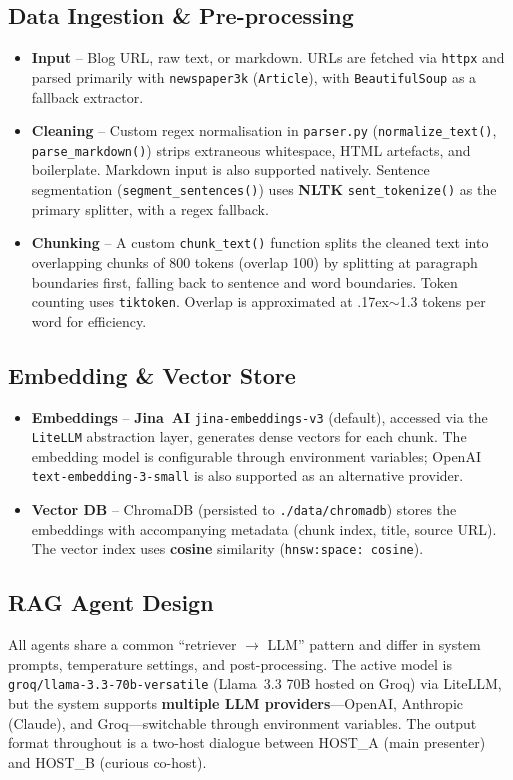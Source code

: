 \documentclass[sigconf,natbib=false]{acmart}   %
\begin{document}
\subsection{Data Ingestion \& Pre-processing}
\begin{itemize}
  \item \textbf{Input} -- Blog URL, raw text, or markdown.  URLs are fetched via \texttt{httpx} and parsed primarily with \texttt{newspaper3k} (\texttt{Article}), with \texttt{BeautifulSoup} as a fallback extractor.
  \item \textbf{Cleaning} -- Custom regex normalisation in 
  \texttt{parser.py} (\texttt{normalize\_text()}, \texttt{parse\_markdown()}) strips extraneous whitespace, HTML artefacts, and boilerplate.  Markdown input is also supported natively.  Sentence segmentation (\texttt{segment\_sentences()}) uses \textbf{NLTK} \texttt{sent\_tokenize()} as the primary splitter, with a regex fallback.
  \item \textbf{Chunking} -- A custom \texttt{chunk\_text()} function splits the cleaned text into overlapping chunks of 800 tokens (overlap 100) by splitting at paragraph boundaries first, falling back to sentence and word boundaries.  Token counting uses \texttt{tiktoken}.  Overlap is approximated at {\raise.17ex\hbox{$\scriptstyle\sim$}}1.3 tokens per word for efficiency.
\end{itemize}

\subsection{Embedding \& Vector Store}
\begin{itemize}
  \item \textbf{Embeddings} -- \textbf{Jina~AI} \texttt{jina-embeddings-v3} (default), accessed via the \texttt{LiteLLM} abstraction layer, generates dense vectors for each chunk.  The embedding model is configurable through environment variables; OpenAI \texttt{text-embedding-3-small} is also supported as an alternative provider.
  \item \textbf{Vector DB} -- ChromaDB (persisted to \texttt{./data/chromadb}) stores the embeddings with accompanying metadata (chunk index, title, source URL).  The vector index uses \textbf{cosine} similarity (\texttt{hnsw:space: cosine}).
\end{itemize}

\subsection{RAG Agent Design}
All agents share a common ``retriever $\to$ LLM'' pattern and differ in system prompts, temperature settings, and post-processing.  The active model is \texttt{groq/llama-3.3-70b-versatile} (Llama~3.3 70B hosted on Groq) via LiteLLM, but the system supports \textbf{multiple LLM providers}---OpenAI, Anthropic (Claude), and Groq---switchable through environment variables.  The output format throughout is a two-host dialogue between HOST\_A (main presenter) and HOST\_B (curious co-host).
\end{document}

